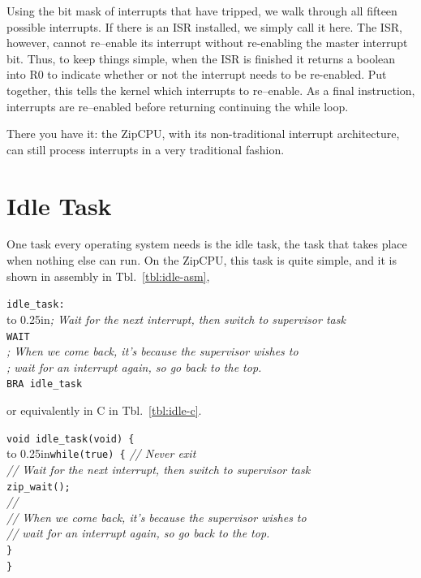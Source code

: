 \documentclass{gqtekspec}
\begin{document}
Using the bit mask of interrupts that have tripped, we walk through all fifteen
possible interrupts.  If there is an ISR installed, we simply call it here.  The
ISR, however, cannot re--enable its interrupt without re-enabling the master
interrupt bit.  Thus, to keep things simple, when the ISR is finished it returns
a boolean into R0 to indicate whether or not the interrupt needs to be
re-enabled.  Put together, this tells the kernel which interrupts to re--enable.
As a final instruction, interrupts are re--enabled before returning continuing
the while loop.

There you have it: the ZipCPU, with its non-traditional interrupt architecture,
can still process interrupts in a very traditional fashion. 

\section{Idle Task}
One task every operating system needs is the idle task, the task that takes
place when nothing else can run.  On the ZipCPU, this task is quite simple,
and it is shown in assembly in Tbl.~\ref{tbl:idle-asm},
\begin{table}\begin{center}
\begin{tabbing}
{\tt idle\_task:} \\
\hbox to 0.25in{}\= {\em ; Wait for the next interrupt, then switch to supervisor task} \\
\>        {\tt WAIT} \\
\>        {\em ; When we come back, it's because the supervisor wishes to} \\
\>        {\em ; wait for an interrupt again, so go back to the top.} \\
\>        {\tt BRA idle\_task} \\
\end{tabbing}
\caption{Example Idle Task in Assembly}\label{tbl:idle-asm}
\end{center}\end{table}
or equivalently in C in Tbl.~\ref{tbl:idle-c}.
\begin{table}\begin{center}
\begin{tabbing}
{\tt void idle\_task(void) \{} \\
\hbox to 0.25in{}\={\tt while(true) \{} {\em // Never exit}\\
\> {\em // Wait for the next interrupt, then switch to supervisor task} \\

\> {\tt zip\_wait();} \\
\> {\em // } \\
\> {\em // When we come back, it's because the supervisor wishes to} \\
\> {\em // wait for an interrupt again, so go back to the top.} \\
\> {\tt \}} \\
{\tt \}}
\end{tabbing}
\caption{Example Idle Task in C}\label{tbl:idle-c}
\end{center}\end{table}
\end{document}
